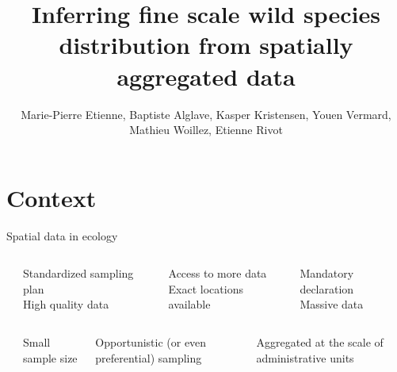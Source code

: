 \documentclass[
  10pt,
  ignorenonframetext,
]{beamer}
\institute{06/2022 - AFH}
\title{Inferring fine scale wild species distribution from spatially aggregated
data}
\author{Marie-Pierre Etienne, Baptiste Alglave, Kasper Kristensen, Youen
Vermard, Mathieu Woillez, Etienne Rivot}
\date{}
\begin{document}
\frame{\titlepage}

\hypertarget{context}{%
\section{Context}\label{context}}

\begin{frame}{Spatial data in ecology}
\protect\hypertarget{spatial-data-in-ecology}{}

\begin{columns}
\begin{column}{0.1\textwidth}
\end{column}
\begin{column}{0.3\textwidth}
\end{column}
\begin{column}{0.3\textwidth}
\end{column}
\begin{column}{0.3\textwidth}
\end{column}
\end{columns}

\vspace{\baselineskip}

\begin{columns}
\begin{column}{0.1\textwidth}
\center \Huge \textbf{\textcolor{BaptisteBlue}{}}
\normalsize
\end{column}
\begin{column}{0.3\textwidth}
\normalsize
Standardized sampling plan \\
High quality data
\end{column}
\begin{column}{0.3\textwidth}
Access to more data \\
Exact locations available
\end{column}
\begin{column}{0.3\textwidth}
Mandatory declaration \\
Massive data
\end{column}
\end{columns}

\vspace{\baselineskip}

\begin{columns}
\begin{column}{0.1\textwidth}
\center \Huge \fontsize{45}{15}{\textbf{\textcolor{BaptisteBlue}{-}}}
\normalsize
\end{column}
\begin{column}{0.3\textwidth}
\normalsize
Small sample size
\end{column}
\begin{column}{0.3\textwidth}
Opportunistic (or even preferential) sampling
\end{column}
\begin{column}{0.3\textwidth}
Aggregated at the scale of administrative units
\end{column}
\end{columns}


\end{frame}
\end{document}
